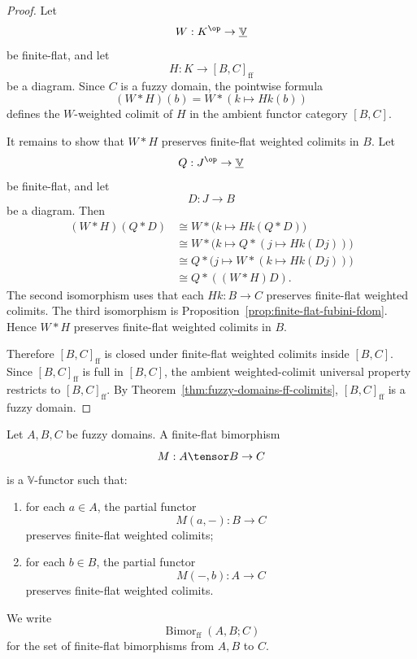 \begin{proof}
Let
\[
    W:K^{\op}\to\underline{\mathbb V}
\]
be finite-flat, and let
\[
    H:K\to[B,C]_{\mathrm{ff}}
\]
be a diagram.  Since \(C\) is a fuzzy domain, the pointwise formula
\[
    (W*H)(b)=W*(k\mapsto Hk(b))
\]
defines the \(W\)-weighted colimit of \(H\) in the ambient functor category
\([B,C]\).

It remains to show that \(W*H\) preserves finite-flat weighted colimits in
\(B\).  Let
\[
    Q:J^{\op}\to\underline{\mathbb V}
\]
be finite-flat, and let
\[
    D:J\to B
\]
be a diagram.  Then
\[
\begin{aligned}
    (W*H)(Q*D)
    &\cong
    W*\bigl(k\mapsto Hk(Q*D)\bigr)
    \\
    &\cong
    W*\bigl(k\mapsto Q*(j\mapsto Hk(Dj))\bigr)
    \\
    &\cong
    Q*\bigl(j\mapsto W*(k\mapsto Hk(Dj))\bigr)
    \\
    &\cong
    Q*((W*H)D).
\end{aligned}
\]
The second isomorphism uses that each \(Hk:B\to C\) preserves finite-flat
weighted colimits.  The third isomorphism is
Proposition~\ref{prop:finite-flat-fubini-fdom}.  Hence \(W*H\) preserves
finite-flat weighted colimits in \(B\).

Therefore \([B,C]_{\mathrm{ff}}\) is closed under finite-flat weighted colimits
inside \([B,C]\).  Since \([B,C]_{\mathrm{ff}}\) is full in \([B,C]\), the
ambient weighted-colimit universal property restricts to
\([B,C]_{\mathrm{ff}}\).  By
Theorem~\ref{thm:fuzzy-domains-ff-colimits},
\([B,C]_{\mathrm{ff}}\) is a fuzzy domain.
\end{proof}

\begin{definition}
\label{def:finite-flat-bimorphism-fdom}
Let \(A,B,C\) be fuzzy domains.  A finite-flat bimorphism
\[
    M:A\tensor B\to C
\]
is a \(\mathbb V\)-functor such that:
\begin{enumerate}
    \item for each \(a\in A\), the partial functor
    \[
        M(a,-):B\to C
    \]
    preserves finite-flat weighted colimits;
    \item for each \(b\in B\), the partial functor
    \[
        M(-,b):A\to C
    \]
    preserves finite-flat weighted colimits.
\end{enumerate}
We write
\[
    \operatorname{Bimor}_{\mathrm{ff}}(A,B;C)
\]
for the set of finite-flat bimorphisms from \(A,B\) to \(C\).
\end{definition}

